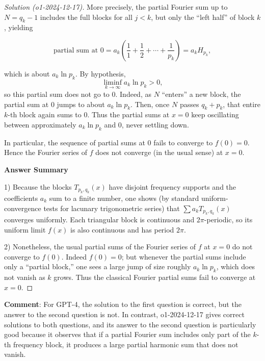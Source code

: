\documentclass[11pt]{article}
\numberwithin{equation}{section}
\begin{document}
\begin{proof}[Solution (o1-2024-12-17)]
More precisely, the partial Fourier sum up to \(N=q_k - 1\) includes the full blocks for all \(j<k\), but only the ``left half'' of block \(k\), yielding

\[
\text{partial sum at }0
= a_k \left( \frac11 + \frac12 + \cdots + \frac1{p_k} \right)
= a_k H_{p_k},
\]

which is about \(a_k \ln p_k\). By hypothesis,
\[
\liminf_{k\to\infty} a_k \ln p_k > 0,
\]
so this partial sum does not go to \(0\). Indeed, as \(N\) ``enters'' a new block, the partial sum at \(0\) jumps to about \(a_k \ln p_k\). Then, once \(N\) passes \(q_k + p_k\), that entire \(k\)-th block again sums to \(0\). Thus the partial sums at \(x=0\) keep oscillating between approximately \(a_k \ln p_k\) and \(0\), never settling down.

In particular, the sequence of partial sums at \(0\) fails to converge to \(f(0)=0\). Hence the Fourier series of \(f\) does not converge (in the usual sense) at \(x=0\).

\bigskip

\textbf{Answer Summary}

1) Because the blocks \(T_{p_k,q_k}(x)\) have disjoint frequency supports and the coefficients \(a_k\) sum to a finite number, one shows (by standard uniform-convergence tests for lacunary trigonometric series) that  
\(\sum a_k T_{p_k,q_k}(x)\)  
converges uniformly. Each triangular block is continuous and \(2\pi\)-periodic, so its uniform limit \(f(x)\) is also continuous and has period \(2\pi\).

2) Nonetheless, the usual partial sums of the Fourier series of \(f\) at \(x=0\) do not converge to \(f(0)\). Indeed \(f(0)=0\); but whenever the partial sums include only a ``partial block,'' one sees a large jump of size roughly \(a_k \ln p_k\), which does not vanish as \(k\) grows. Thus the classical Fourier partial sums fail to converge at \(x=0\).

\end{proof}

\textbf{Comment}: For GPT-4, the solution to the first question is correct, but the answer to the second question is not. In contrast, o1-2024-12-17 gives correct solutions to both questions, and its answer to the second question is particularly good because it observes that if a partial Fourier sum includes only part of the $k$-th frequency block, it produces a large partial harmonic sum that does not vanish.
\end{document}
